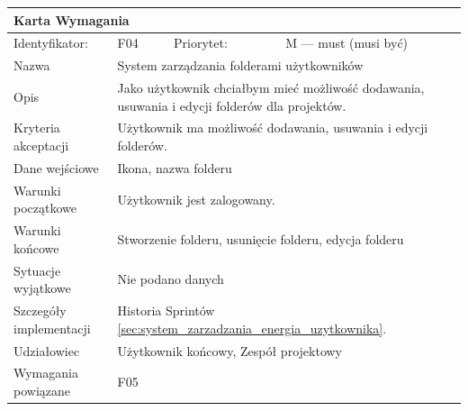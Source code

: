 \documentclass[a4paper,11pt]{report}
\begin{document}
		\begin{tabular}{|p{3cm}|p{2cm}|p{2cm}|p{6cm}|}
		\hline
		\multicolumn{4}{|p{12 cm}|}{Karta Wymagania}\\
		\hline
		Identyfikator: & F04 & Priorytet: & M — must (musi być)\\
		\hline
		Nazwa & \multicolumn{3}{|p{10 cm}|}{System zarządzania folderami użytkowników}\\
		\hline
		Opis & \multicolumn{3}{|p{10 cm}|}{Jako użytkownik chciałbym mieć możliwość dodawania, usuwania i edycji folderów dla projektów.}\\
		\hline
		Kryteria akceptacji & \multicolumn{3}{|p{10 cm}|}{Użytkownik ma możliwość dodawania, usuwania i edycji folderów.}\\
		\hline
		Dane wejściowe & \multicolumn{3}{|p{10 cm}|}{Ikona, nazwa folderu}\\
		\hline
		Warunki początkowe & \multicolumn{3}{|p{10 cm}|}{Użytkownik jest zalogowany.}\\
		\hline
		Warunki końcowe & \multicolumn{3}{|p{10 cm}|}{Stworzenie folderu, usunięcie folderu, edycja folderu}\\
		\hline
		Sytuacje wyjątkowe & \multicolumn{3}{|p{10 cm}|}{Nie podano danych}\\
		\hline
		Szczegóły implementacji & \multicolumn{3}{|p{10 cm}|}{Historia Sprintów \ref{sec:system_zarzadzania_energia_uzytkownika}.}\\
		\hline
		Udziałowiec & \multicolumn{3}{|p{10 cm}|}{Użytkownik końcowy, Zespół projektowy}\\
		\hline
		Wymagania powiązane & \multicolumn{3}{|p{10 cm}|}{F05}\\
		\hline
		\end{tabular}\\
		\newline
		\vspace*{0,2 cm}
		\newline
\end{document}
